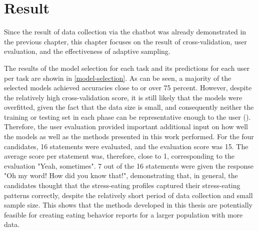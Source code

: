 
\chapter{Result}\label{chapter:result}
Since the result of data collection via the chatbot was already demonstrated in the previous chapter, this chapter focuses on the result of cross-validation, user evaluation, and the effectiveness of adaptive sampling.

The results of the model selection for each task and its predictions for each user per task are showin in \autoref{model-selection}. As can be seen, a majority of the selected models achieved accuracies close to or over 75 percent. However, despite the relatively high cross-validation score, it is still likely that the models were overfitted, given the fact that the data size is small, and consequently neither the training or testing set in each phase can be representative enough to the user (\cite{45_overfitting}). Therefore, the user evaluation provided important additional input on how well the models as well as the methods presented in this work performed. For the four candidates, 16 statements were evaluated, and the evaluation score was 15. The average score per statement was, therefore, close to 1, corresponding to the evaluation "Yeah, sometimes". 7 out of the 16 statements were given the response "Oh my word! How did you know that!", demonstrating that, in general, the candidates thought that the stress-eating profiles captured their stress-eating patterns correctly, despite the relatively short period of data collection and small sample size. This shows that the methods developed in this thesis are potentially feasible for creating eating behavior reports for a larger population with more data.\bigskip

